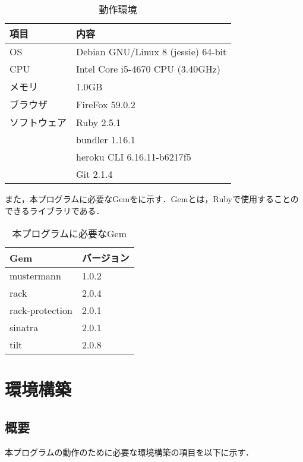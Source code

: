 \documentclass[12pt]{jsarticle}
\begin{document}
\begin{table}[h]
  \begin{center}
    \caption{動作環境}\label{tab:prod_env}
    \begin{tabular}{l|l}
      \hline \hline
      項目 & 内容 \\ \hline
      OS & Debian GNU/Linux 8 (jessie) 64-bit \\ 
      CPU & Intel Core i5-4670 CPU (3.40GHz)\\
      メモリ & 1.0GB \\ 
      ブラウザ & FireFox 59.0.2 \\ 
      ソフトウェア & Ruby 2.5.1 \\
      & bundler 1.16.1 \\
      & heroku CLI 6.16.11-b6217f5  \\
      & Git 2.1.4 \\
      \hline
    \end{tabular}
  \end{center}
\end{table}

また，本プログラムに必要なGemをに示す．Gemとは，Rubyで使用することのできるライブラリである．

\begin{table}[h]
  \begin{center}
    \caption{本プログラムに必要なGem}\label{tab:gem_table}
    \begin{tabular}{l|l}
      \hline \hline
      Gem & バージョン \\
      \hline 
      mustermann & 1.0.2 \\
      rack & 2.0.4 \\
      rack-protection & 2.0.1 \\
      sinatra & 2.0.1 \\
      tilt & 2.0.8 \\
      \hline
    \end{tabular}
  \end{center}
\end{table}


\newpage
\section{環境構築}
\label{sec:setup}
\subsection{概要}
本プログラムの動作のために必要な環境構築の項目を以下に示す．
\end{document}
